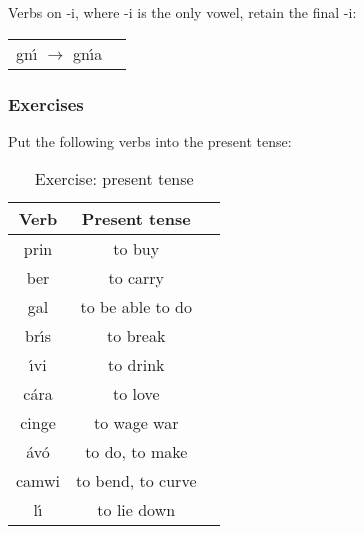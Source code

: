 Verbs on -i, where -i is the only vowel, retain the final -i:
\begin{table}[H]
\begin{tabular}{ll}
  gn\'{\i} $\rightarrow$ gn\'{\i}a
\end{tabular}
\label{examples_verbs_on_i_only_vowel}
\end{table}

\newpage
\subsubsection{Exercises}
Put the following verbs into the present tense:
\begin{table}[H]
\centering
\begin{tabular}{|c|c|M{10.0cm}|}
  \toprule
  \textbf{Verb} & \textbf{Present tense}\\
  \toprule
  prin & to buy & \\
  \midrule
  ber & to carry & \\
  \midrule
  gal & to be able to do & \\
  \midrule
  br\'{\i}s & to break & \\
  \midrule
  \'{\i}vi & to drink & \\
  \midrule
  c\'{a}ra & to love & \\
  \midrule
  cinge & to wage war & \\
  \midrule
  \'{a}v\'{o} & to do, to make & \\
  \midrule
  camwi & to bend, to curve & \\
  \midrule
  l\'{\i} & to lie down & \\
  \bottomrule
\end{tabular}
\caption{Exercise: present tense}
\label{exercise_present_tense}
\end{table}

\newpage
